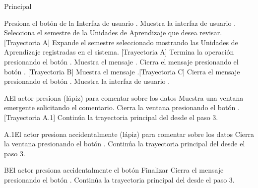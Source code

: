\begin{UCtrayectoria}{Principal}

    \UCpaso[\UCactor] Presiona el botón  de la Interfaz de usuario  .
    \UCpaso Muestra la interfaz de usuario .
    \UCpaso[\UCactor] Selecciona el semestre de la Unidades de Aprendizaje que desea revisar. [Trayectoria A]
    \UCpaso Expande el semestre seleccionado mostrando las Unidades de Aprendizaje registradas en el sistema. [Trayectoria A]
    \UCpaso[\UCactor] Termina la operación presionando el botón .
    \UCpaso Muestra el mensaje .
    \UCpaso[\UCactor] Cierra el mensaje presionando el botón . [Trayectoria B]
    \UCpaso Muestra el mensaje .[Trayectoria C]
    \UCpaso[\UCactor] Cierra el mensaje presionando el botón .
    \UCpaso Muestra la interfaz de usuario .
\end{UCtrayectoria}


\begin{UCtrayectoriaA}{A}{El actor presiona (lápiz) para comentar sobre los datos}
    \UCpaso Muestra una ventana emergente solicitando el comentario.
    \UCpaso[\UCactor] Cierra la ventana presionando el botón . [Trayectoria A.1]
    \UCpaso Continúa la trayectoria principal del  desde el paso 3.
\end{UCtrayectoriaA}


\begin{UCtrayectoriaA}{A.1}{El actor presiona accidentalmente (lápiz) para comentar sobre los datos}
    \UCpaso[\UCactor] Cierra la ventana presionando el botón .
    \UCpaso Continúa la trayectoria principal del  desde el paso 3.
\end{UCtrayectoriaA}

\begin{UCtrayectoriaA}{B}{El actor presiona accidentalmente el botón Finalizar}
    \UCpaso[\UCactor] Cierra el mensaje presionando el botón .
    \UCpaso Continúa la trayectoria principal del  desde el paso 3.
\end{UCtrayectoriaA}

